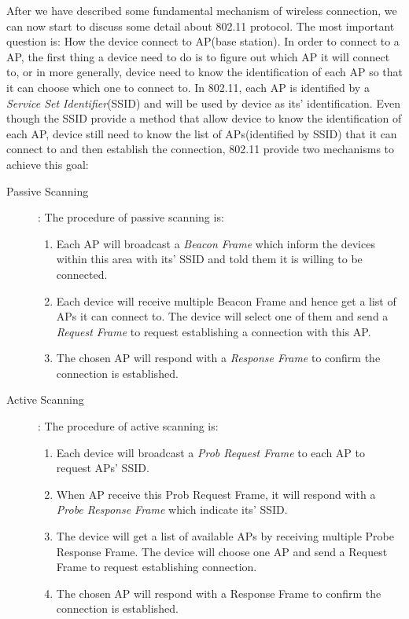 \documentclass[10pt,a4paper]{article}
\begin{document}
After we have described some fundamental mechanism of wireless connection, we can now start to discuss some detail about 802.11 protocol. The most important question is: How the device connect to AP(base station). In order to connect to a AP, the first thing a device need to do is to figure out which AP it will connect to, or in more generally, device need to know the identification of each AP so that it can choose which one to connect to. In 802.11, each AP is identified by a \textit{Service Set Identifier}(SSID) and will be used by device as its' identification. Even though the SSID provide a method that allow device to know the identification of each AP, device still need to know the list of APs(identified by SSID) that it can connect to and then establish the connection, 802.11 provide two mechanisms to achieve this goal:
\begin{description}
	\item[Passive Scanning]: The procedure of passive scanning is:
	\begin{enumerate}
		\item Each AP will broadcast a \textit{Beacon Frame} which inform the devices within this area with its' SSID and told them it is willing to be connected.
		\item Each device will receive multiple Beacon Frame and hence get a list of APs it can connect to. The device will select one of them and send a \textit{Request Frame} to request establishing a connection with this AP.
		\item The chosen AP will respond with a \textit{Response Frame} to confirm the connection is established.
	\end{enumerate}
	\item[Active Scanning]: The procedure of active scanning is:
	\begin{enumerate}
		\item Each device will broadcast a \textit{Prob Request Frame} to each AP to request APs' SSID.
		\item When AP receive this Prob Request Frame, it will respond with a \textit{Probe Response Frame} which indicate its' SSID.
		\item The device will get a list of available APs by receiving multiple Probe Response Frame. The device will choose one AP and send a Request Frame to request establishing connection.
		\item The chosen AP will respond with a Response Frame to confirm the connection is established.
	\end{enumerate}
\end{description}
\end{document}
